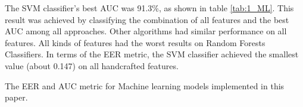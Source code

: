 The SVM classifier’s best AUC was 91.3\%, as shown in table \ref{tab:1_ML}. This result was achieved by classifying the combination of all features and the best AUC among all approaches. Other algorithms had similar performance on all features. All kinds of features had the worst results on Random Forests Classifiers. In terms of the EER metric, the SVM classifier achieved the smallest value (about 0.147) on all handcrafted features.














 


\begin{center}
	\begin{table}[!t]
	\centering
	\caption{The EER and AUC metric for Machine learning models implemented in this paper.}
	\label{tab:1_ML}
	
	\end{table}
\end{center}

